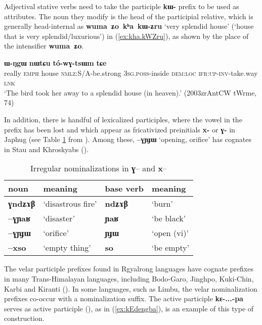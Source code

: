 \documentclass[oneside,a4paper,11pt]{article}
\newcommand{\ipa}[1]{\textbf{{\phon\mbox{#1}}}} %
\begin{document}
Adjectival stative verbs need to take the participle \ipa{kɯ-} prefix to be used as attributes. The noun they modify is the head of the participial relative, which is generally head-internal as \ipa{wuma ʑo kʰa kɯ-ʑru} `very splendid house' (`house that is very splendid/luxurious') in (\ref{ex:kha.kWZru}), as shown by the place of the intensifier \ipa{wuma ʑo}.

 \begin{exe}
\ex \label{ex:kha.kWZru}
 \gll  [\ipa{wuma}	\ipa{ʑo}	\ipa{kʰa}	\ipa{kɯ-ʑru}]	\ipa{ɯ-ŋgɯ}	\ipa{nɯtɕu}	\ipa{tó-wɣ-tsɯm}	\ipa{tɕe} \\
 really \textsc{emph} house \textsc{nmlz}:S/A-be.strong \textsc{3sg}.\textsc{poss}-inside \textsc{dem}:\textsc{loc} \textsc{ifr}:\textsc{up}-\textsc{inv}-take.way \textsc{lnk} \\
\glt `The bird took her away to a splendid house (in heaven).' (2003zrAntCW tWrme, 74)
\end{exe}

In addition, there is handful of lexicalized participles, where the vowel in the prefix has been lost and which appear as fricativized preinitials \ipa{x-} or \ipa{ɣ-} in Japhug (see Table \ref{tab:irr.nmlz}  from \citealt[5]{jacques14antipassive}). Among these, \ipa{--ɣɲɟɯ} `opening, orifice'  has cognates in Stau and Khroskyabs (\citealt[609]{jacques17stau}).

\begin{table}[H]
\caption{Irregular nominalizations in \ipa{ɣ}-- and \ipa{x}--} \label{tab:irr.nmlz} \centering
\begin{tabular}{llll}
\toprule
 noun & meaning &base verb & meaning\\
\midrule 
\ipa{\textbf{ɣ}ndʑɤβ} & `disastrous fire' & \ipa{ndʑɤβ} & `burn' \\
\ipa{--\textbf{ɣ}ɲaʁ}   &`disaster'& \ipa{ɲaʁ} & `be black' \\
\ipa{--\textbf{ɣ}ɲɟɯ}   & `orifice' & \ipa{ɲɟɯ} &  `open (vi)' \\
\ipa{--\textbf{x}so}   &  `empty thing' &\ipa{so} & `be empty' \\
\bottomrule
\end{tabular}
\end{table}


The velar participle prefixes found in Rgyalrong languages have cognate prefixes in many Trans-Himalayan languages, including Bodo-Garo, Jinghpo, Kuki-Chin, Karbi and Kiranti (\citealt{konnerth16gV, delancey15adjectival}).   In some languages, such as Limbu, the velar nominalization prefixes co-occur with a nominalization suffix. The active participle \ipa{kɛ-...-pa} serves as active participle (\citealt[199-202]{driem87}), as in (\ref{ex:kEdengba}), is an example of this type of construction.
\end{document}
